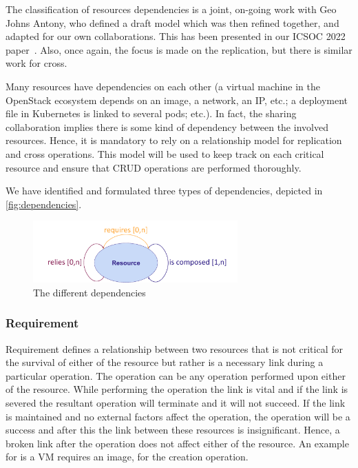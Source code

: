 The classification of resources dependencies is a joint, on-going work
with Geo Johns Antony, who defined a draft model which was then
refined together, and adapted for our own collaborations.
%
This has been presented in our ICSOC 2022 paper~\cite{DAL22true,
  DAL22}.
%
Also, once again, the focus is made on the replication, but there
is similar work for cross.

Many resources have dependencies on each other (a virtual machine in
the OpenStack ecosystem depends on an image, a network, an IP, etc.; a
deployment file in Kubernetes is linked to several pods; etc.).
%
In fact, the sharing collaboration implies there is some kind of
dependency between the involved resources.
%
Hence, it is mandatory to rely on a relationship model for replication
and cross operations.
%
This model will be used to keep track on each critical resource and
ensure that CRUD operations are performed thoroughly.

%
We have identified and formulated three types of dependencies, depicted in
\autoref{fig:dependencies}.
\begin{figure}[htbp]
    \centering
    \includegraphics[width=0.7\textwidth]{figs/pdf/classification.pdf}
    \caption{The different dependencies}
    \label{fig:dependencies}
  \end{figure}



\subsubsection{Requirement}

Requirement defines a relationship between two resources that is not
critical for the survival of either of the resource but rather is a
necessary link during a particular operation.
%
The operation can be any operation performed upon either of the
resource.
%
While performing the operation the link is vital and if the link is
severed the resultant operation will terminate and it will not
succeed.
%
If the link is maintained and no external factors affect the
operation, the operation will be a success and after this the link
between these resources is insignificant.
%
Hence, a broken link after the operation does not affect either of the
resource. An example for \os is a VM requires an image, for the
creation operation.

